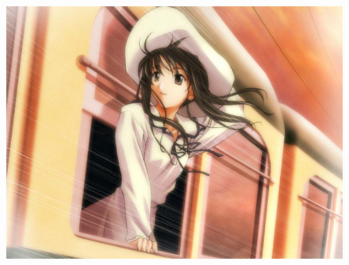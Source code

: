 \documentclass{./banyuan-ppt}
\begin{document}
\begin{frame}
\begin{figure}
{            \includegraphics[width=\otherpicwidth]{./res/sample.png}
        }
        \hfil
    \end{figure}
\end{frame}
\end{document}
